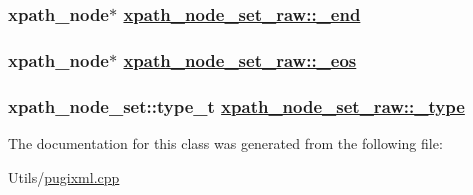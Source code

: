 \hypertarget{classxpath__node__set__raw_f8435774146a65edee6cf320dbb8930f}{
\subsubsection[\_\-end]{\setlength{\rightskip}{0pt plus 5cm}xpath\_\-node$\ast$ \hyperlink{classxpath__node__set__raw_f8435774146a65edee6cf320dbb8930f}{xpath\_\-node\_\-set\_\-raw::\_\-end}}}
\label{classxpath__node__set__raw_f8435774146a65edee6cf320dbb8930f}


\hypertarget{classxpath__node__set__raw_886a925457f162fe38483da1d57b9b56}{
\subsubsection[\_\-eos]{\setlength{\rightskip}{0pt plus 5cm}xpath\_\-node$\ast$ \hyperlink{classxpath__node__set__raw_886a925457f162fe38483da1d57b9b56}{xpath\_\-node\_\-set\_\-raw::\_\-eos}}}
\label{classxpath__node__set__raw_886a925457f162fe38483da1d57b9b56}


\hypertarget{classxpath__node__set__raw_00a164066aff1d6075631b2532ed9713}{
\subsubsection[\_\-type]{\setlength{\rightskip}{0pt plus 5cm}xpath\_\-node\_\-set::type\_\-t \hyperlink{classxpath__node__set__raw_00a164066aff1d6075631b2532ed9713}{xpath\_\-node\_\-set\_\-raw::\_\-type}}}
\label{classxpath__node__set__raw_00a164066aff1d6075631b2532ed9713}




The documentation for this class was generated from the following file:\begin{CompactItemize}
\item 
Utils/\hyperlink{pugixml_8cpp}{pugixml.cpp}\end{CompactItemize}
